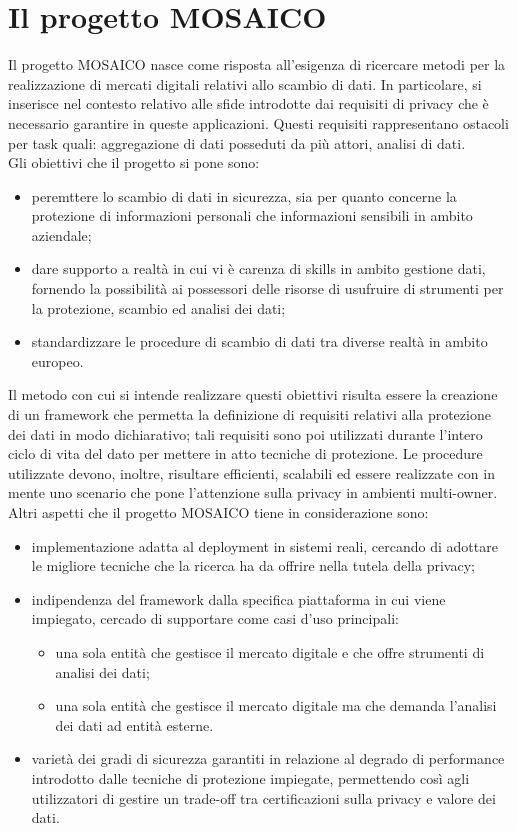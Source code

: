 \documentclass[12pt,a4paper,twoside]{book}
\begin{document}
\chapter{Il progetto MOSAICO}
Il progetto MOSAICO nasce come risposta all'esigenza di ricercare metodi per la realizzazione di mercati digitali relativi allo scambio di dati\cite{ProgettoMosaico}. In particolare, si inserisce nel contesto relativo alle sfide introdotte dai requisiti di privacy che è necessario garantire in queste applicazioni. Questi requisiti rappresentano ostacoli per task quali: aggregazione di dati posseduti da più attori, analisi di dati.\\
Gli obiettivi che il progetto si pone sono:
\begin{itemize}
\item peremttere lo scambio di dati in sicurezza, sia per quanto concerne la protezione di informazioni personali che informazioni sensibili in ambito aziendale;
\item dare supporto a realtà in cui vi è carenza di skills in ambito gestione dati, fornendo la possibilità ai possessori delle risorse di usufruire di strumenti per la protezione, scambio ed analisi dei dati;
\item standardizzare le procedure di scambio di dati tra diverse realtà in ambito europeo.
\end{itemize}
Il metodo con cui si intende realizzare questi obiettivi risulta essere la creazione di un framework che permetta la definizione di requisiti relativi alla protezione dei dati in modo dichiarativo; tali requisiti sono poi utilizzati durante l'intero ciclo di vita del dato per mettere in atto tecniche di protezione. Le procedure utilizzate devono, inoltre, risultare efficienti, scalabili ed essere realizzate con in mente uno scenario che pone l'attenzione sulla privacy in ambienti multi-owner.\\
Altri aspetti che il progetto MOSAICO tiene in considerazione sono:
\begin{itemize}
\item implementazione adatta al deployment in sistemi reali, cercando di adottare le migliore tecniche che la ricerca ha da offrire nella tutela della privacy;
\item indipendenza del framework dalla specifica piattaforma in cui viene impiegato, cercado di supportare come casi d'uso principali:
\begin{itemize}
\item una sola entità che gestisce il mercato digitale e che offre strumenti di analisi dei dati;
\item una sola entità che gestisce il mercato digitale ma che demanda l'analisi dei dati ad entità esterne.
\end{itemize}
\item varietà dei gradi di sicurezza garantiti in relazione al degrado di performance introdotto dalle tecniche di protezione impiegate, permettendo così agli utilizzatori di gestire un trade-off tra certificazioni sulla privacy e valore dei dati.
\end{itemize}
\end{document}
